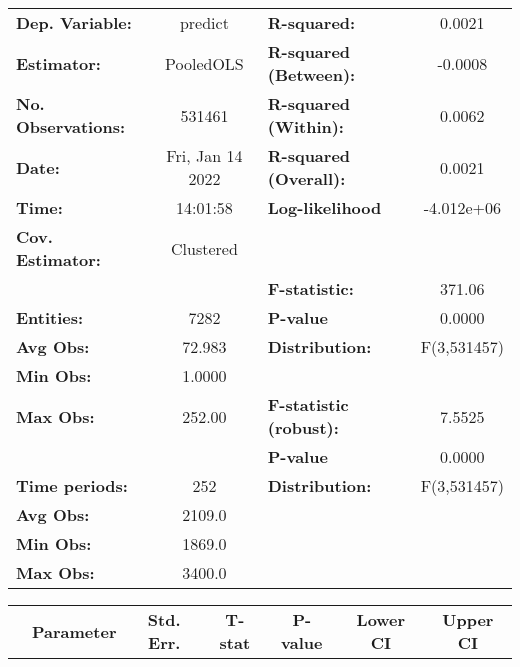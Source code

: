 \begin{center}
\begin{tabular}{lclc}
\toprule
\textbf{Dep. Variable:}    &      predict       & \textbf{  R-squared:         }   &      0.0021      \\
\textbf{Estimator:}        &     PooledOLS      & \textbf{  R-squared (Between):}  &     -0.0008      \\
\textbf{No. Observations:} &       531461       & \textbf{  R-squared (Within):}   &      0.0062      \\
\textbf{Date:}             &  Fri, Jan 14 2022  & \textbf{  R-squared (Overall):}  &      0.0021      \\
\textbf{Time:}             &      14:01:58      & \textbf{  Log-likelihood     }   &    -4.012e+06    \\
\textbf{Cov. Estimator:}   &     Clustered      & \textbf{                     }   &                  \\
\textbf{}                  &                    & \textbf{  F-statistic:       }   &      371.06      \\
\textbf{Entities:}         &        7282        & \textbf{  P-value            }   &      0.0000      \\
\textbf{Avg Obs:}          &       72.983       & \textbf{  Distribution:      }   &   F(3,531457)    \\
\textbf{Min Obs:}          &       1.0000       & \textbf{                     }   &                  \\
\textbf{Max Obs:}          &       252.00       & \textbf{  F-statistic (robust):} &      7.5525      \\
\textbf{}                  &                    & \textbf{  P-value            }   &      0.0000      \\
\textbf{Time periods:}     &        252         & \textbf{  Distribution:      }   &   F(3,531457)    \\
\textbf{Avg Obs:}          &       2109.0       & \textbf{                     }   &                  \\
\textbf{Min Obs:}          &       1869.0       & \textbf{                     }   &                  \\
\textbf{Max Obs:}          &       3400.0       & \textbf{                     }   &                  \\
\bottomrule
\end{tabular}
\begin{tabular}{lcccccc}
                & \textbf{Parameter} & \textbf{Std. Err.} & \textbf{T-stat} & \textbf{P-value} & \textbf{Lower CI} & \textbf{Upper CI}  \\

\end{tabular}
\end{center}
